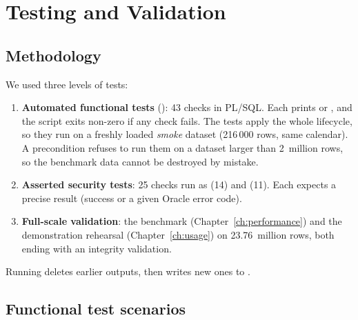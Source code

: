 \chapter{Testing and Validation}\label{ch:testing}

\section{Methodology}

We used three levels of tests:

\begin{enumerate}
  \item \textbf{Automated functional tests} ():
        43 checks in PL/SQL. Each prints  or , and the script exits
        non-zero if any check fails. The tests apply the whole lifecycle, so they run on a
        freshly loaded \emph{smoke} dataset (216\,000 rows, same calendar). A precondition
        refuses to run them on a dataset larger than 2~million rows, so the benchmark data
        cannot be destroyed by mistake.
  \item \textbf{Asserted security tests}: 25 checks run as  (14) and
         (11). Each expects a precise result (success or a given Oracle
        error code).
  \item \textbf{Full-scale validation}: the benchmark (Chapter~\ref{ch:performance}) and the
        demonstration rehearsal (Chapter~\ref{ch:usage}) on 23.76~million rows, both ending
        with an integrity validation.
\end{enumerate}

Running  deletes earlier outputs, then writes new ones to
.

\section{Functional test scenarios}

